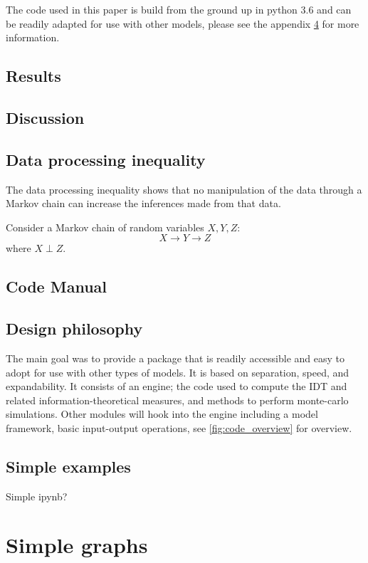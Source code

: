 \documentclass[twoside, twocolumn]{article}
\begin{document}
	The code used in this paper is build from the ground up in python 3.6 and can be readily adapted for use with other models, please see the appendix \ref{sec:code} for more information.
	
	\section{Results}
	
	\section{Discussion}
	\printbibliography
	\begin{appendices}
	\section{Data processing inequality}
	The data processing inequality shows that no manipulation of the data through a Markov chain can increase the inferences made from that data.
	
	Consider a Markov chain of random variables $X, Y, Z$:
	$$ X \rightarrow Y \rightarrow Z$$
	where $X \perp Z$. 

	\section{Code Manual}
	\label{sec:code}
	\section{Design philosophy}
	The main goal was to provide a package that is readily accessible and easy to adopt for use with other types of models. It is based on separation, speed, and expandability. It consists of an engine; the code used to compute the IDT and related information-theoretical measures, and methods to perform monte-carlo simulations. Other modules will hook into the engine including a model framework, basic input-output operations, see \ref{fig:code_overview} for overview.

	\section{Simple examples}
	Simple ipynb?	
	\chapter{Simple graphs}
	
	\end{appendices}
	
\end{document}
